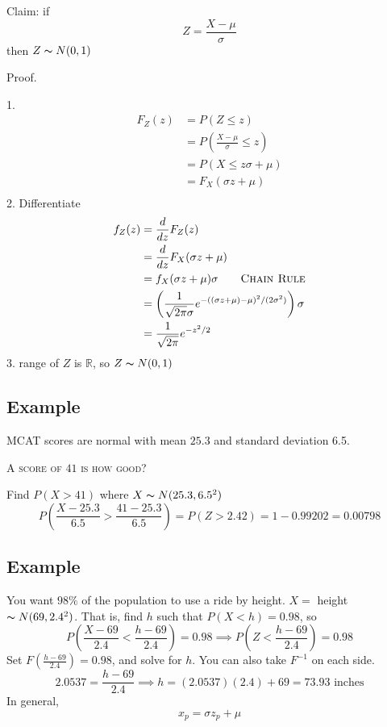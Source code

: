 Claim: if
\[ Z=\frac{X-\mu}{\sigma}  \]
then $ Z \thicksim N(0,1) $

Proof.

1.
\begin{align*}
    F_Z(z)&=P(Z\le z)\\
    &=P\left(\frac{X-\mu}{\sigma}\le z\right)\\
    &=P\left(X\le z\sigma + \mu\right)\\
    &=F_X(\sigma z+\mu)\\
\end{align*}
2. Differentiate
\begin{align*}
    f_Z(z)&=\frac{d}{dz}F_Z(z)\\
    &=\frac{d}{dz}F_X(\sigma z+\mu)\\
    &=f_X(\sigma z+\mu)\sigma \qquad \textsc{Chain Rule}\\
    &=\left(\frac{1}{\sqrt{2\pi}\sigma}e^{-((\sigma z+\mu)-\mu)^2/(2\sigma^2)}\right)\sigma\\
    &=\frac{1}{\sqrt{2\pi}}e^{-z^2/2}
\end{align*}
3. range of $ Z $ is $ \mathbb{R} $, so $ Z \thicksim N(0,1) $

\subsection{Example}
MCAT scores are normal with mean $ 25.3 $ and standard deviation 6.5.

\textsc{A score of $ 41 $ is how good?}

Find $ P(X>41) $ where $ X \thicksim N(25.3,6.5^2) $
\[ P\left(\frac{X-25.3}{6.5}>\frac{41-25.3}{6.5}\right)=P(Z>2.42)=1-0.99202=0.00798 \]

\subsection{Example}
You want $ 98\% $ of the population to use a ride by height.
$ X= $ height $ \thicksim N(69,2.4^2) $. That is, find $ h $
such that $ P(X<h)=0.98 $, so
\[ P\left(\frac{X-69}{2.4}<\frac{h-69}{2.4}\right)=0.98\implies P\left(Z<\frac{h-69}{2.4}\right)=0.98\]
Set $F(\frac{h-69}{2.4})=0.98 $, and solve for $ h $. You can also take $ F^{-1} $ on each side.
\[ 2.0537=\frac{h-69}{2.4}\implies h=(2.0537)(2.4)+69=73.93\text{ inches} \]
In general,
\[ x_p=\sigma z_p+\mu \]